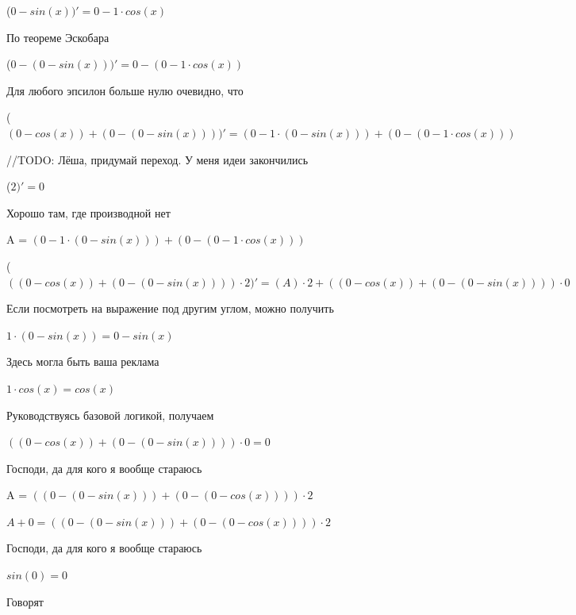 \documentclass[12pt,a4paper,fleqn]{article}
\begin{document}
\begin{center}
 ($0-sin(x))'
  = 0-1 \cdot cos(x)$\end{center}
По теореме Эскобара

\begin{center}
 ($0-(0-sin(x)))'
  = 0-(0-1 \cdot cos(x))$\end{center}
Для любого эпсилон больше нулю очевидно, что

\begin{center}
 ($(0-cos(x))+(0-(0-sin(x))))'
  = (0-1 \cdot (0-sin(x)))+(0-(0-1 \cdot cos(x)))$\end{center}
//TODO: Лёша, придумай переход. У меня идеи закончились

\begin{center}
 ($2)'
  = 0$\end{center}
Хорошо там, где производной нет\cite{link2}

\begin{center}
A = $(0-1 \cdot (0-sin(x)))+(0-(0-1 \cdot cos(x)))$\end{center}
\begin{center}
 ($((0-cos(x))+(0-(0-sin(x)))) \cdot 2)'
  = (A) \cdot 2+((0-cos(x))+(0-(0-sin(x)))) \cdot 0$\end{center}
Если посмотреть на выражение под другим углом, можно получить

\begin{center}
$1 \cdot (0-sin(x)) = 0-sin(x)$\end{center}
Здесь могла быть ваша реклама

\begin{center}
$1 \cdot cos(x) = cos(x)$\end{center}
Руководствуясь базовой логикой, получаем

\begin{center}
$((0-cos(x))+(0-(0-sin(x)))) \cdot 0 = 0$\end{center}
Господи, да для кого я вообще стараюсь

\begin{center}
A = $((0-(0-sin(x)))+(0-(0-cos(x)))) \cdot 2$\end{center}
\begin{center}
$A+0 = ((0-(0-sin(x)))+(0-(0-cos(x)))) \cdot 2$\end{center}
Господи, да для кого я вообще стараюсь

\begin{center}
\end{center}
\begin{center}$sin(0) = 0$\end{center}
Говорят
\end{document}
